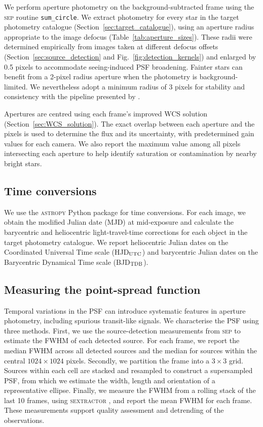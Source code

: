 \documentclass[fleqn,usenatbib]{mnras}
\newcommand{\ngts}{{NGTS}}
\begin{document}
We perform aperture photometry on the background-subtracted frame using the \textsc{sep} routine \texttt{sum\_circle}. We extract photometry for every star in the target photometry catalogue (Section~\ref{sec:target_catalogue}), using an aperture radius appropriate to the image defocus (Table~\ref{tab:aperture_sizes}). These radii were determined empirically from images taken at different defocus offsets (Section~\ref{sec:source_detection} and Fig.~\ref{fig:detection_kernels}) and enlarged by 0.5 pixels to accommodate seeing-induced PSF broadening. Fainter stars can benefit from a 2-pixel radius aperture when the photometry is background-limited. We nevertheless adopt a minimum radius of 3 pixels for stability and consistency with the pipeline presented by \citet{2018MNRAS.475.4476W}.

Apertures are centred using each frame's improved WCS solution (Section~\ref{sec:WCS_solution}). The exact overlap between each aperture and the pixels is used to determine the flux and its uncertainty, with predetermined gain values for each camera. We also report the maximum value among all pixels intersecting each aperture to help identify saturation or contamination by nearby bright stars.

\subsection{Time conversions}

We use the \textsc{astropy} Python package \citep{astropy:2013,astropy:2018,astropy:2022} for time conversions. For each image, we obtain the modified Julian date (MJD) at mid-exposure and calculate the barycentric and heliocentric light-travel-time corrections for each object in the target photometry catalogue. We report heliocentric Julian dates on the Coordinated Universal Time scale (HJD$_{\rm UTC}$) and barycentric Julian dates on the Barycentric Dynamical Time scale (BJD$_{\rm TDB}$).


\subsection{Measuring the point-spread function}\label{sec:psf}

Temporal variations in the PSF can introduce systematic features in aperture photometry, including spurious transit-like signals. We characterise the PSF using three methods. First, we use the source-detection measurements from \textsc{sep} to estimate the FWHM of each detected source. For each frame, we report the median FWHM across all detected sources and the median for sources within the central $1024\times1024$ pixels. Secondly, we partition the frame into a $3\times3$ grid. Sources within each cell are stacked and resampled to construct a supersampled PSF, from which we estimate the width, length and orientation of a representative ellipse. Finally, we measure the FWHM from a rolling stack of the last 10 frames, using \textsc{sextractor} \citep{1996A&AS..117..393B}, and report the mean FWHM for each frame. These measurements support quality assessment and detrending of the observations.
\end{document}
